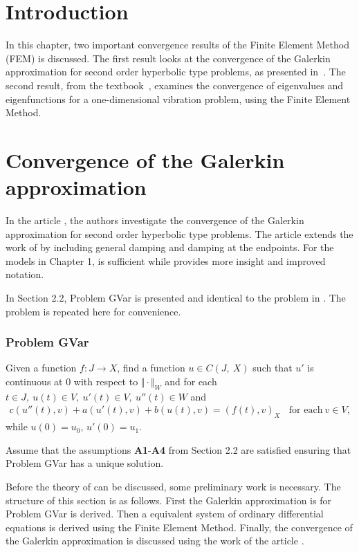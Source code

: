 \documentclass[../../main.tex]{subfiles}
\begin{document}
\section{Introduction}
In this chapter, two important convergence results of the Finite Element Method
(FEM) is discussed. The first result looks at the convergence of the Galerkin
approximation for second order hyperbolic type problems, as presented
in~\cite{BV13}. The second result, from the textbook~\cite{SF97}, examines the
convergence of eigenvalues and eigenfunctions for a one-dimensional vibration
problem, using the Finite Element Method.

\section{Convergence of the Galerkin approximation}\label{sec:convergence-of-the-galerkin-approximation}
In the article \cite{BV13}, the authors investigate the convergence of the
Galerkin approximation for second order hyperbolic type problems. The article
\cite{BV18} extends the work of \cite{BV13} by including general damping and
damping at the endpoints. For the models in Chapter 1, \cite{BV13} is
sufficient while \cite{BV18} provides more insight and improved notation.

In Section 2.2, Problem GVar is presented and identical to the problem in
\cite{BV13}. The problem is repeated here for convenience.

\subsubsection*{Problem GVar}
Given a function $f:J\rightarrow X$, find a function $u\in C(J,\ X)$ such that $u'$ is continuous at $0$ with respect to
$\Vert \cdot \Vert_{W}$ and for each $t\in J,\ u(t)\in V,\ u'(t) \in V,\ u''(t)\in W$ and
\begin{eqnarray}
	c(u''(t),v)+a(u'(t),v)+b(u(t),v)= (f(t),v)_{X} \ \ \ \ \textrm{for each} \ v \in V, \label{GV_PB1}
\end{eqnarray}
while $u(0)=u_{0}$, $u'(0)=u_{1}$.

Assume that the assumptions \textbf{A1}-\textbf{A4} from Section 2.2 are
satisfied ensuring that Problem GVar has a unique solution.

Before the theory of \cite{BV13} can be discussed, some preliminary work is
necessary. The structure of this section is as follows. First the Galerkin
approximation is for Problem GVar is derived. Then a equivalent system of
ordinary differential equations is derived using the Finite Element Method.
Finally, the convergence of the Galerkin approximation is discussed using the
work of the article \cite{BV13}.
\end{document}
